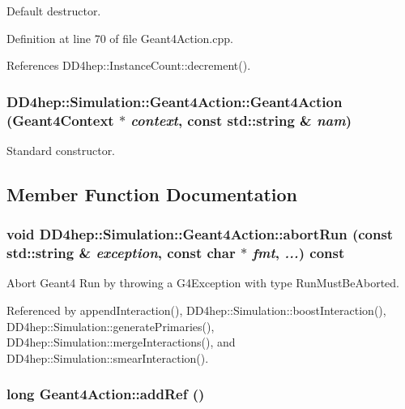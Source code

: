 Default destructor. 

Definition at line 70 of file Geant4Action.cpp.

References DD4hep::InstanceCount::decrement().\hypertarget{class_d_d4hep_1_1_simulation_1_1_geant4_action_aa4751aea8e811093f9c88aa2016f16b3}{
\subsubsection[{Geant4Action}]{\setlength{\rightskip}{0pt plus 5cm}DD4hep::Simulation::Geant4Action::Geant4Action ({\bf Geant4Context} $\ast$ {\em context}, \/  const std::string \& {\em nam})}}
\label{class_d_d4hep_1_1_simulation_1_1_geant4_action_aa4751aea8e811093f9c88aa2016f16b3}


Standard constructor. 

\subsection{Member Function Documentation}
\hypertarget{class_d_d4hep_1_1_simulation_1_1_geant4_action_aed0d02c2f482dc0435b6ca51504356be}{
\subsubsection[{abortRun}]{\setlength{\rightskip}{0pt plus 5cm}void DD4hep::Simulation::Geant4Action::abortRun (const std::string \& {\em exception}, \/  const char $\ast$ {\em fmt}, \/   {\em ...}) const}}
\label{class_d_d4hep_1_1_simulation_1_1_geant4_action_aed0d02c2f482dc0435b6ca51504356be}


Abort Geant4 Run by throwing a G4Exception with type RunMustBeAborted. 

Referenced by appendInteraction(), DD4hep::Simulation::boostInteraction(), DD4hep::Simulation::generatePrimaries(), DD4hep::Simulation::mergeInteractions(), and DD4hep::Simulation::smearInteraction().\hypertarget{class_d_d4hep_1_1_simulation_1_1_geant4_action_abf90df73db256488940810101fd63a8a}{
\subsubsection[{addRef}]{\setlength{\rightskip}{0pt plus 5cm}long Geant4Action::addRef ()}}
\label{class_d_d4hep_1_1_simulation_1_1_geant4_action_abf90df73db256488940810101fd63a8a}


